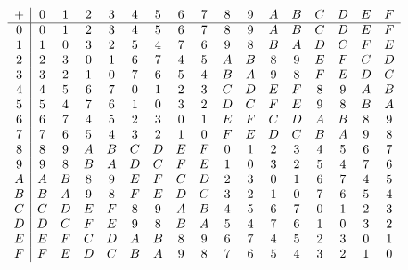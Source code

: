 \documentclass[12pt]{article}
\begin{document}
\begin{center}
    $\begin{array}{ c | c c c c c c c c c c c c c c c c }
		+ & 0 & 1 & 2 & 3 & 4 & 5 & 6 & 7 & 8 & 9 & A & B & C & D & E & F \\ \hline
		0 & 0 & 1 & 2 & 3 & 4 & 5 & 6 & 7 & 8 & 9 & A & B & C & D & E & F \\
		1 & 1 & 0 & 3 & 2 & 5 & 4 & 7 & 6 & 9 & 8 & B & A & D & C & F & E \\
		2 & 2 & 3 & 0 & 1 & 6 & 7 & 4 & 5 & A & B & 8 & 9 & E & F & C & D \\
		3 & 3 & 2 & 1 & 0 & 7 & 6 & 5 & 4 & B & A & 9 & 8 & F & E & D & C \\
		4 & 4 & 5 & 6 & 7 & 0 & 1 & 2 & 3 & C & D & E & F & 8 & 9 & A & B \\
		5 & 5 & 4 & 7 & 6 & 1 & 0 & 3 & 2 & D & C & F & E & 9 & 8 & B & A \\
		6 & 6 & 7 & 4 & 5 & 2 & 3 & 0 & 1 & E & F & C & D & A & B & 8 & 9 \\
		7 & 7 & 6 & 5 & 4 & 3 & 2 & 1 & 0 & F & E & D & C & B & A & 9 & 8 \\
		8 & 8 & 9 & A & B & C & D & E & F & 0 & 1 & 2 & 3 & 4 & 5 & 6 & 7 \\
		9 & 9 & 8 & B & A & D & C & F & E & 1 & 0 & 3 & 2 & 5 & 4 & 7 & 6 \\
		A & A & B & 8 & 9 & E & F & C & D & 2 & 3 & 0 & 1 & 6 & 7 & 4 & 5 \\
		B & B & A & 9 & 8 & F & E & D & C & 3 & 2 & 1 & 0 & 7 & 6 & 5 & 4 \\
		C & C & D & E & F & 8 & 9 & A & B & 4 & 5 & 6 & 7 & 0 & 1 & 2 & 3 \\
		D & D & C & F & E & 9 & 8 & B & A & 5 & 4 & 7 & 6 & 1 & 0 & 3 & 2 \\
		E & E & F & C & D & A & B & 8 & 9 & 6 & 7 & 4 & 5 & 2 & 3 & 0 & 1 \\
		F & F & E & D & C & B & A & 9 & 8 & 7 & 6 & 5 & 4 & 3 & 2 & 1 & 0 \\
	\end{array}$
\end{center}
\end{document}
